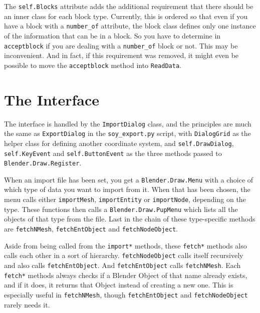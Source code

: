 The \texttt{self.Blocks} attribute adds the additional requirement that there should be an inner class for each block type. Currently, this is ordered so that even if you have a block with a \texttt{number\_of} attribute, the block class defines only one instance of the information that can be in a block. So you have to determine in \texttt{acceptblock} if you are dealing with a \texttt{number\_of} block or not. This may be inconvenient. And in fact, if this requirement was removed, it might even be possible to move the \texttt{acceptblock} method into \texttt{ReadData}.

\section*{The Interface}
The interface is handled by the \texttt{ImportDialog} class, and the principles are much the same as \texttt{ExportDialog} in the \texttt{soy\_export.py} script, with \texttt{DialogGrid} as the helper class for defining another coordinate system, and \texttt{self.DrawDialog}, \texttt{self.KeyEvent} and \texttt{self.ButtonEvent} as the three methods passed to \\ \texttt{Blender.Draw.Register}.

When an import file has been set, you get a \texttt{Blender.Draw.Menu} with a choice of which type of data you want to import from it. When that has been chosen, the menu calls either \texttt{importMesh}, \texttt{importEntity} or \texttt{importNode}, depending on the type. These functions then calls a \texttt{Blender.Draw.PupMenu} which lists all the objects of that type from the file. Last in the chain of these type-specific methods are \texttt{fetchNMesh}, \texttt{fetchEntObject} and \texttt{fetchNodeObject}.

Aside from being called from the \texttt{import*} methods, these \texttt{fetch*} methods also calls each other in a sort of hierarchy. \texttt{fetchNodeObject} calls itself recursively and also calls \texttt{fetchEntObject}. And \texttt{fetchEntObject} calls \texttt{fetchNMesh}. Each \texttt{fetch*} methods always checks if a Blender Object of that name already exists, and if it does, it returns that Object instead of creating a new one. This is especially useful in \texttt{fetchNMesh}, though \texttt{fetchEntObject} and \texttt{fetchNodeObject} rarely needs it.

